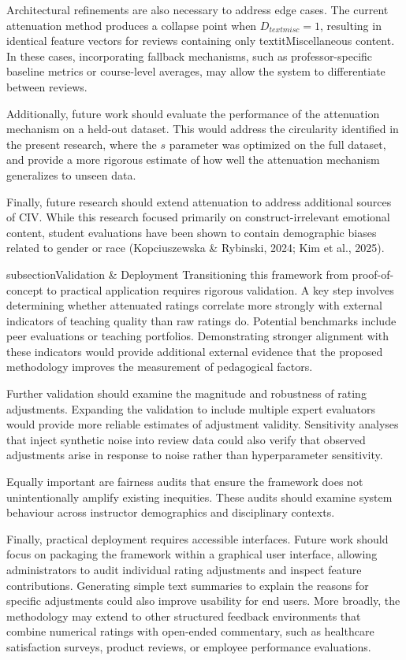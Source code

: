 Architectural refinements are also necessary to address edge cases. The current attenuation method produces a collapse point when $D_{text{misc}} = 1$, resulting in identical feature vectors for reviews containing only textit{Miscellaneous} content. In these cases, incorporating fallback mechanisms, such as professor-specific baseline metrics or course-level averages, may allow the system to differentiate between reviews.

Additionally, future work should evaluate the performance of the attenuation mechanism on a held-out dataset. This would address the circularity identified in the present research, where the $s$ parameter was optimized on the full dataset, and provide a more rigorous estimate of how well the attenuation mechanism generalizes to unseen data.

Finally, future research should extend attenuation to address additional sources of CIV. While this research focused primarily on construct-irrelevant emotional content, student evaluations have been shown to contain demographic biases related to gender or race (Kopciuszewska & Rybinski, 2024; Kim et al., 2025). 

subsection{Validation & Deployment}
Transitioning this framework from proof-of-concept to practical application requires rigorous validation. A key step involves determining whether attenuated ratings correlate more strongly with external indicators of teaching quality than raw ratings do. Potential benchmarks include peer evaluations or teaching portfolios. Demonstrating stronger alignment with these indicators would provide additional external evidence that the proposed methodology improves the measurement of pedagogical factors.

Further validation should examine the magnitude and robustness of rating adjustments. Expanding the validation to include multiple expert evaluators would provide more reliable estimates of adjustment validity. Sensitivity analyses that inject synthetic noise into review data could also verify that observed adjustments arise in response to noise rather than hyperparameter sensitivity.

Equally important are fairness audits that ensure the framework does not unintentionally amplify existing inequities. These audits should examine system behaviour across instructor demographics and disciplinary contexts.

Finally, practical deployment requires accessible interfaces. Future work should focus on packaging the framework within a graphical user interface, allowing administrators to audit individual rating adjustments and inspect feature contributions. Generating simple text summaries to explain the reasons for specific adjustments could also improve usability for end users. More broadly, the methodology may extend to other structured feedback environments that combine numerical ratings with open-ended commentary, such as healthcare satisfaction surveys, product reviews, or employee performance evaluations.

